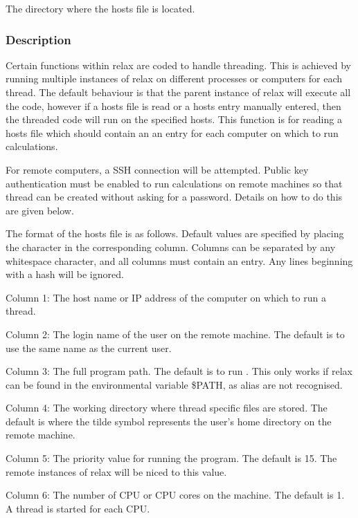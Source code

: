    The directory where the hosts file is located.  

  

  
 \subsubsection{Description} 

 Certain functions within relax are coded to handle threading.  This is achieved by running multiple instances of relax on different processes or computers for each thread.  The default behaviour is that the parent instance of relax will execute all the code, however if a hosts file is read or a hosts entry manually entered, then the threaded code will run on the specified hosts.  This function is for reading a hosts file which should contain an an entry for each computer on which to run calculations. 
  

 For remote computers, a SSH connection will be attempted.  Public key authentication must be enabled to run calculations on remote machines so that thread can be created without asking for a password.  Details on how to do this are given below. 
  

 The format of the hosts file is as follows.  Default values are specified by placing the character \quotecmd{-} in the corresponding column.  Columns can be separated by any whitespace character, and all columns must contain an entry.  Any lines beginning with a hash will be ignored. 
  

 Column 1:  The host name or IP address of the computer on which to run a thread. 
  

 Column 2:  The login name of the user on the remote machine.  The default is to use the same name as the current user. 
  

 Column 3:  The full program path.  The default is to run .  This only works if relax can be found in the environmental variable \$PATH, as alias are not recognised. 
  

 Column 4:  The working directory where thread specific files are stored.  The default is  where the tilde \quotecmd{\~{}} symbol represents the user's home directory on the remote machine. 
  

 Column 5:  The priority value for running the program.  The default is 15.  The remote instances of relax will be niced to this value. 
  

 Column 6:  The number of CPU or CPU cores on the machine.  The default is 1.  A thread is started for each CPU. 
  

